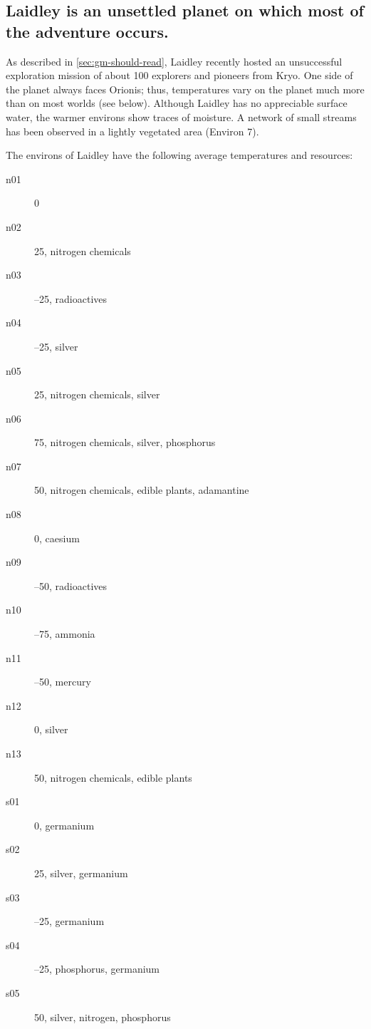 \subsection[Laidley]{Laidley is an unsettled planet on which most of the
  adventure occurs.}
\label{sec:laidley-an-unsettled}

As described in \ref{sec:gm-should-read}, Laidley recently hosted an
unsuccessful exploration mission of about 100 explorers and pioneers
from Kryo. One side of the planet always faces Orionis; thus,
temperatures vary on the planet much more than on most worlds (see
below). Although Laidley has no appreciable surface water, the warmer
environs show traces of moisture. A network of small streams has been
observed in a lightly vegetated area (Environ 7).

The environs of Laidley have the following average temperatures and
resources:

\begin{description}
\item[n01] 0\textdegree 
\item[n02] 25\textdegree, nitrogen chemicals 
\item[n03] --25\textdegree, radioactives 
\item[n04] --25\textdegree, silver 
\item[n05] 25\textdegree, nitrogen chemicals, silver 
\item[n06] 75\textdegree, nitrogen chemicals, silver, phosphorus 
\item[n07] 50\textdegree, nitrogen chemicals, edible plants, adamantine 
\item[n08] 0\textdegree, caesium 
\item[n09] --50\textdegree, radioactives 
\item[n10] --75\textdegree, ammonia 
\item[n11] --50\textdegree, mercury 
\item[n12] 0\textdegree, silver 
\item[n13] 50\textdegree, nitrogen chemicals, edible plants 
\item[s01] 0\textdegree, germanium 
\item[s02] 25\textdegree, silver, germanium 
\item[s03] --25\textdegree, germanium 
\item[s04] --25\textdegree, phosphorus, germanium 
\item[s05] 50\textdegree, silver, nitrogen, phosphorus 
\end{description}

